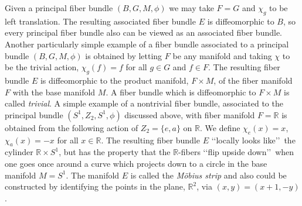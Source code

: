 Given a principal fiber bundle \((B,G,M,\phi)\) we may take \(F=G\) and \(\chi_g\)
to be left translation. The resulting associated fiber bundle \(E\) is
diffeomorphic to \(B\), so every principal fiber bundle also can be viewed as an
associated fiber bundle. Another particularly simple example of a fiber bundle
associated to a principal bundle \((B,G,M,\phi)\) is obtained by letting \(F\) be
any manifold and taking \(\chi\) to be the trivial action,
\(\chi_g(f)=f\) for all \(g\in G\) and \(f\in F\). The resulting fiber bundle \(E\)
is diffeomorphic to the product manifold, \(F\times M\), of the fiber manifold
\(F\) with the base manifold \(M\). A fiber bundle which is diffeomorphic to
\(F\times M\) is called \emph{trivial}. A simple example of a nontrivial fiber
bundle, associated to the principal bundle \((S^1,Z_2,S^1,\phi)\) discussed above,
with fiber manifold \(F=\mathbb R\) is obtained from the following action of
\(Z_2=\{e,a\}\) on \(\mathbb R\). We define \(\chi_e(x)=x\),
\(\chi_a(x)=-x\) for all \(x\in\mathbb R\). The resulting fiber bundle \(E\)
\lq\lq locally looks like\rq\rq\ the cylinder \(\mathbb R\times S^1\), but has the
property that the \(\mathbb R\)-fibers \lq\lq flip upside down\rq\rq\ when one goes
once around a curve which projects down to a circle in the base manifold \(M=S^1\).
The manifold \(E\) is called the \emph{M\"obius strip} and also could be constructed
by identifying the points in the plane, \(\mathbb R^2\), via
\((x,y)=(x+1,-y)\).

